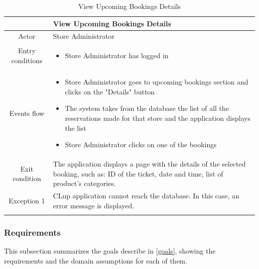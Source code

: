 \documentclass[table, 12pt]{article}
\begin{document}
\begin{longtable}{|c| p{10cm}|}
    \hline
                     & View Upcoming Bookings Details                                                                                                                    \\
    \hline
    Actor            & Store Administrator                                                                                                                               \\
    \hline
    Entry conditions & \begin{itemize}
        \item Store Administrator has logged in
    \end{itemize}                                                                                                                        \\
    \hline
    Events flow      & \begin{itemize}[nosep,after=\strut]
        \item Store Administrator goes to upcoming bookings section and clicks on the "Details" button
        \item The system takes from the database the list of all the reservations made for that store and the application displays the list
        \item Store Administrator clicks on one of the bookings
    \end{itemize}                                                                                                                        \\
    \hline
    Exit condition   & The application displays a page with the details of the selected booking, such as: ID of the ticket, date and time, list of product's categories.
    \\
    \hline
    \hline
    Exception 1      & CLup application cannot reach the database. In this case, an error message is displayed.                                                          \\
    \hline
    \caption{View Upcoming Bookings Details}                                                                                                                             \\
\end{longtable}

\subsubsection{Requirements}
This subsection summarizes the goals describe in \ref{goals}, showing the requirements and the domain assumptions for each of them.
\end{document}
